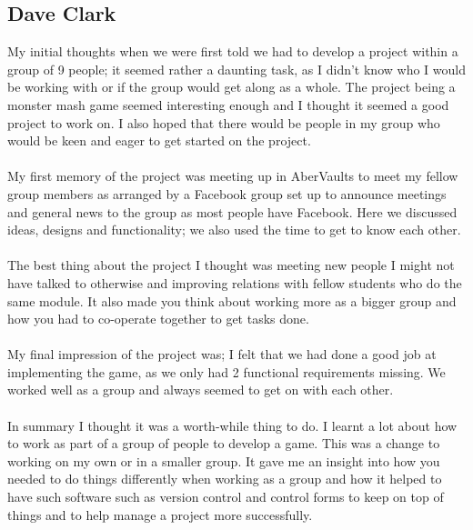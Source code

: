 \documentclass{project}
\begin{document}
\subsection{Dave Clark}
My initial thoughts when we were first told we had to develop a project within a group of 9 people; it seemed rather a daunting task, as I didn’t know who I would be working with or if the group would get along as a whole. The project being a monster mash game seemed interesting enough and I thought it seemed a good project to work on. I also hoped that there would be people in my group who would be keen and eager to get started on the project. 
\\\\
My first memory of the project was meeting up in AberVaults to meet my fellow group members as arranged by a Facebook group set up to announce meetings and general news to the group as most people have Facebook. Here we discussed ideas, designs and functionality; we also used the time to get to know each other.
\\\\
The best thing about the project I thought was meeting new people I might not have talked to otherwise and improving relations with fellow students who do the same module. It also made you think about working more as a bigger group and how you had to co-operate together to get tasks done.
\\\\
My final impression of the project was; I felt that we had done a good job at implementing the game, as we only had 2 functional requirements missing. We worked well as a group and always seemed to get on with each other.
\\\\
In summary I thought it was a worth-while thing to do. I learnt a lot about how to work as part of a group of people to develop a game. This was a change to working on my own or in a smaller group. It gave me an insight into how you needed to do things differently when working as a group and how it helped to have such software such as version control and control forms to keep on top of things and to help manage a project more successfully.
\end{document}
